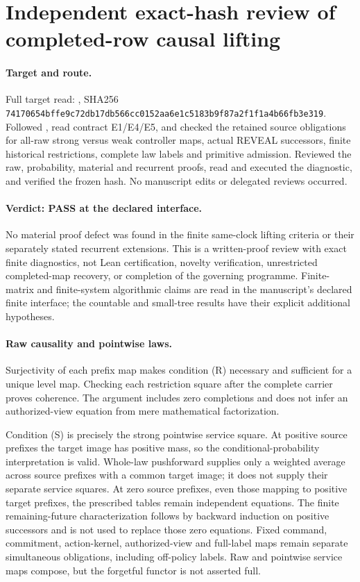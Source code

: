 \documentclass{article}
\begin{document}
\section*{Independent exact-hash review of completed-row causal lifting}
\paragraph{Target and route.}
Full target read: , SHA256
\texttt{74170654bffe9c72db17db566cc0152aa6e1c5183b9f87a2f1f1a4b66fb3e319}.
Followed , read contract E1/E4/E5, and checked the retained source obligations for all-raw strong versus weak controller maps, actual REVEAL successors, finite historical restrictions, complete law labels and primitive admission. Reviewed the raw, probability, material and recurrent proofs, read and executed the diagnostic, and verified the frozen hash. No manuscript edits or delegated reviews occurred.

\paragraph{Verdict: PASS at the declared interface.}
No material proof defect was found in the finite same-clock lifting criteria or their separately stated recurrent extensions. This is a written-proof review with exact finite diagnostics, not Lean certification, novelty verification, unrestricted completed-map recovery, or completion of the governing programme. Finite-matrix and finite-system algorithmic claims are read in the manuscript's declared finite interface; the countable and small-tree results have their explicit additional hypotheses.

\paragraph{Raw causality and pointwise laws.}
Surjectivity of each prefix map makes condition (R) necessary and sufficient for a unique level map. Checking each restriction square after the complete carrier proves coherence. The argument includes zero completions and does not infer an authorized-view equation from mere mathematical factorization.

Condition (S) is precisely the strong pointwise service square. At positive source prefixes the target image has positive mass, so the conditional-probability interpretation is valid. Whole-law pushforward supplies only a weighted average across source prefixes with a common target image; it does not supply their separate service squares. At zero source prefixes, even those mapping to positive target prefixes, the prescribed tables remain independent equations. The finite remaining-future characterization follows by backward induction on positive successors and is not used to replace those zero equations. Fixed command, commitment, action-kernel, authorized-view and full-label maps remain separate simultaneous obligations, including off-policy labels. Raw and pointwise service maps compose, but the forgetful functor is not asserted full.
\end{document}
